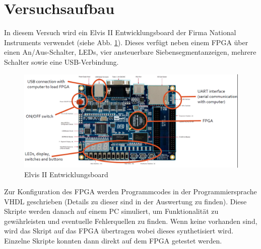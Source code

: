 \section{Versuchsaufbau}
In diesem Versuch wird ein Elvis II Entwicklungsboard der Firma National Instruments verwendet (siehe Abb. \ref{board}).
Dieses verfügt neben einem FPGA über einen An/Aus-Schalter, LEDs, vier ansteuerbare Siebensegmentanzeigen, mehrere Schalter sowie eine USB-Verbindung.

\begin{figure}[h]
  \includegraphics[width=\linewidth]{../Daten/board.png}
  \caption{Elvis II Entwicklungsboard}
  \label{board}
\end{figure}

Zur Konfiguration des FPGA werden Programmcodes in der Programmiersprache VHDL geschrieben (Details zu dieser sind in der Auswertung zu finden).
Diese Skripte werden danach auf einem PC simuliert, um Funktionalität zu gewährleisten und eventuelle Fehlerquellen zu finden.
Wenn keine vorhanden sind, wird das Skript auf das FPGA übertragen wobei dieses synthetisiert wird.
Einzelne Skripte konnten dann direkt auf dem FPGA getestet werden.
